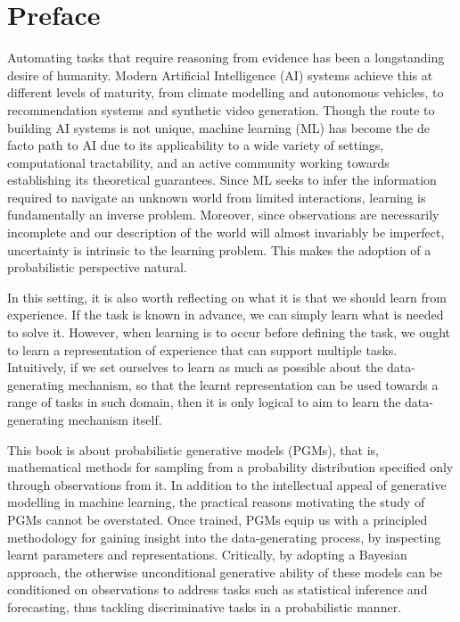 


\section*{Preface}
Automating tasks that require reasoning from evidence has been a longstanding desire of humanity. Modern Artificial Intelligence (AI) systems achieve this at different levels of maturity, from climate modelling and autonomous vehicles, to recommendation systems and synthetic video generation. Though the route to building AI systems is not unique, machine learning (ML) has become the de facto path to AI due to its applicability to a wide variety of settings, computational tractability, and an active community working towards establishing its theoretical guarantees. Since ML seeks to infer the information required to navigate an unknown world from limited interactions, learning is fundamentally an inverse problem. Moreover, since observations are necessarily incomplete and our description of the world will  almost invariably be imperfect, uncertainty is intrinsic to the learning problem. This makes the adoption of a probabilistic perspective natural. 

In this setting, it is also worth reflecting on what it is that we should learn from experience. If the task is known in advance, we can simply learn what is needed to solve it. However, when learning is to occur before defining the task, we ought to learn a representation of experience  that can support multiple tasks. Intuitively, if we set ourselves to learn as much as possible about the  data-generating mechanism, so that the learnt representation can be used towards a range of tasks in such domain, then it is only logical to aim to learn the data-generating mechanism itself. 

This book is about probabilistic generative models (PGMs), that is, mathematical methods for sampling from a probability distribution specified only through observations from it. In addition to the intellectual appeal of generative modelling in machine learning, the practical reasons motivating the study of PGMs cannot be overstated. Once trained, PGMs equip us with a principled methodology for gaining insight into the data-generating process, by inspecting learnt parameters and representations. Critically, by adopting a Bayesian approach, the otherwise unconditional generative ability of these models can be conditioned on observations to address tasks such as statistical inference and forecasting, thus tackling discriminative tasks in a probabilistic manner. 

